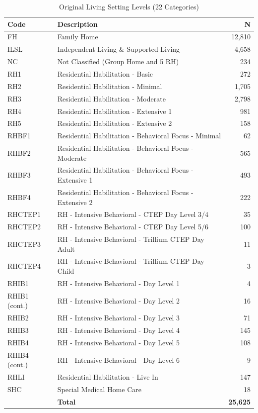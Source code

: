 \begin{table}[H]
\centering
\caption{Original Living Setting Levels (22 Categories)}
\small
\begin{tabular}{lp{8cm}r}
\toprule
\textbf{Code} & \textbf{Description} & \textbf{N} \\
\midrule
FH & Family Home & 12,810 \\
ILSL & Independent Living \& Supported Living & 4,658 \\
NC & Not Classified (Group Home and 5 RH) & 234 \\
RH1 & Residential Habilitation - Basic & 272 \\
RH2 & Residential Habilitation - Minimal & 1,705 \\
RH3 & Residential Habilitation - Moderate & 2,798 \\
RH4 & Residential Habilitation - Extensive 1 & 981 \\
RH5 & Residential Habilitation - Extensive 2 & 158 \\
RHBF1 & Residential Habilitation - Behavioral Focus - Minimal & 62 \\
RHBF2 & Residential Habilitation - Behavioral Focus - Moderate & 565 \\
RHBF3 & Residential Habilitation - Behavioral Focus - Extensive 1 & 493 \\
RHBF4 & Residential Habilitation - Behavioral Focus - Extensive 2 & 222 \\
RHCTEP1 & RH - Intensive Behavioral - CTEP Day Level 3/4 & 35 \\
RHCTEP2 & RH - Intensive Behavioral - CTEP Day Level 5/6 & 100 \\
RHCTEP3 & RH - Intensive Behavioral - Trillium CTEP Day Adult & 11 \\
RHCTEP4 & RH - Intensive Behavioral - Trillium CTEP Day Child & 3 \\
RHIB1 & RH - Intensive Behavioral - Day Level 1 & 4 \\
RHIB1 (cont.) & RH - Intensive Behavioral - Day Level 2 & 16 \\
RHIB2 & RH - Intensive Behavioral - Day Level 3 & 71 \\
RHIB3 & RH - Intensive Behavioral - Day Level 4 & 145 \\
RHIB4 & RH - Intensive Behavioral - Day Level 5 & 108 \\
RHIB4 (cont.) & RH - Intensive Behavioral - Day Level 6 & 9 \\
RHLI & Residential Habilitation - Live In & 147 \\
SHC & Special Medical Home Care & 18 \\
\midrule
& \textbf{Total} & \textbf{25,625} \\
\bottomrule
\end{tabular}
\label{tab:original-living-setting}
\end{table}

